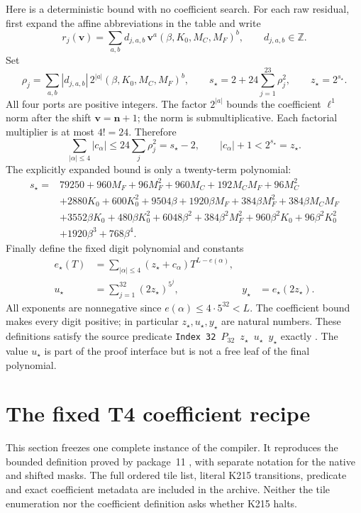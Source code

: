 \documentclass[11pt,a4paper]{article}
\theoremstyle{remark}
\newcommand{\ZZ}{\mathbb Z}
\begin{document}
Here is a deterministic bound with no coefficient search.  For each raw
residual, first expand the affine abbreviations in the table and write
\[
 r_j(\mathbf v)=\sum_{a,b}d_{j,a,b}\,
       \mathbf v^a(\beta,K_0,M_C,M_F)^b,
 \qquad d_{j,a,b}\in\ZZ.
\]
Set
\[
 \rho_j=\sum_{a,b}|d_{j,a,b}|\,2^{|a|}
                  (\beta,K_0,M_C,M_F)^b,\qquad
 s_\star=2+24\sum_{j=1}^{23}\rho_j^2,
 \qquad z_\star=2^{s_\star}.
\]
All four ports are positive integers.  The factor $2^{|a|}$ bounds
the coefficient $\ell^1$ norm after the shift $\mathbf v=\mathbf n+1$;
the norm is submultiplicative.  Each factorial multiplier is at most
$4!=24$.  Therefore
\[
 \sum_{|\alpha|\le4}|c_\alpha|
       \le24\sum_j\rho_j^2=s_\star-2,
 \qquad |c_\alpha|+1<2^{s_\star}=z_\star.
\]
The explicitly expanded bound is only a twenty-term polynomial:
\begin{align*}
 s_\star={}&79250+960M_F+96M_F^2+960M_C+192M_CM_F+96M_C^2\\
 &+2880K_0+600K_0^2+9504\beta+1920\beta M_F
       +384\beta M_F^2+384\beta M_CM_F\\
 &+3552\beta K_0+480\beta K_0^2+6048\beta^2
       +384\beta^2M_F^2+960\beta^2K_0+96\beta^2K_0^2\\
 &+1920\beta^3+768\beta^4.
\end{align*}
Finally define the fixed digit polynomial and constants
\begin{align*}
 e_\star(T)&=\sum_{|\alpha|\le4}(z_\star+c_\alpha)T^{L-e(\alpha)},\\
 u_\star&=\sum_{j=1}^{32}(2z_\star)^{5^j},
 &y_\star&=e_\star(2z_\star).
\end{align*}
All exponents are nonnegative since
$e(\alpha)\le4\cdot5^{32}<L$.
The coefficient bound makes every digit positive; in particular
$z_\star,u_\star,y_\star$ are natural numbers.  These definitions satisfy
the source predicate \texttt{Index 32 $P_{32}$ $z_\star$ $u_\star$ $y_\star$}
exactly \cite{nineformal}.  The value $u_\star$ is part of the proof
interface but is not a free leaf of the final polynomial.





\section{The fixed T4 coefficient recipe}
\label{sec:t4-recipe}

This section freezes one complete instance of the compiler.  It
reproduces the bounded definition proved by package~11 \cite{t4}, with
separate notation for the native and shifted masks.  The full ordered
tile list, literal K215 transitions, predicate and exact coefficient
metadata are included in the archive.  Neither the tile enumeration
nor the coefficient definition asks whether K215 halts.
\end{document}
